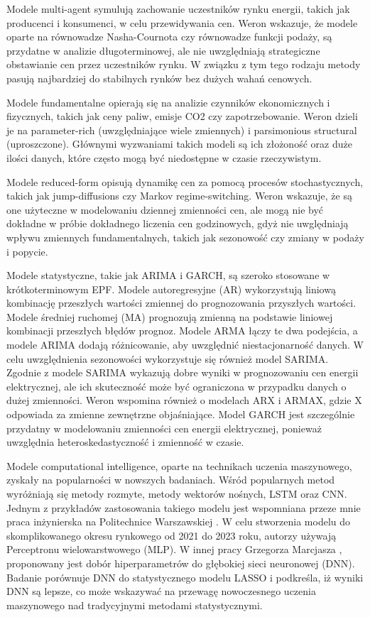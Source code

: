 Modele multi-agent symulują zachowanie uczestników rynku energii, takich jak producenci i konsumenci, w celu przewidywania cen. Weron \cite{WERON20141030} wskazuje, że modele oparte na równowadze Nasha-Cournota czy równowadze funkcji podaży, są przydatne w analizie długoterminowej, ale nie uwzględniają strategiczne obstawianie cen przez uczestników rynku. W związku z tym tego rodzaju metody pasują najbardziej do stabilnych rynków bez dużych wahań cenowych. 

Modele fundamentalne opierają się na analizie czynników ekonomicznych i fizycznych, takich jak ceny paliw, emisje CO2 czy zapotrzebowanie. Weron \cite{WERON20141030} dzieli je na parameter-rich (uwzględniające wiele zmiennych) i parsimonious structural (uproszczone). Głównymi wyzwaniami takich modeli są ich złożoność oraz duże ilości danych, które często mogą być niedostępne w czasie rzeczywistym. 

Modele reduced-form opisują dynamikę cen za pomocą procesów stochastycznych, takich jak jump-diffusions czy Markov regime-switching. Weron \cite{WERON20141030} wskazuje, że są one użyteczne w modelowaniu dziennej zmienności cen, ale mogą nie być dokładne w próbie dokładnego liczenia cen godzinowych, gdyż nie uwględniają wpływu zmiennych fundamentalnych, takich jak sezonowość czy zmiany w podaży i popycie.

Modele statystyczne, takie jak ARIMA i GARCH, są szeroko stosowane w krótkoterminowym EPF. Modele autoregresyjne (AR) wykorzystują liniową kombinację przeszłych wartości zmiennej do prognozowania przyszłych wartości. Modele średniej ruchomej (MA) prognozują zmienną na podstawie liniowej kombinacji przeszłych błędów prognoz. Modele ARMA łączy te dwa podejścia, a modele ARIMA dodają różnicowanie, aby uwzględnić niestacjonarność danych. W celu uwzględnienia sezonowości wykorzystuje się również model SARIMA. Zgodnie z \cite{appliedmath3020018} modele SARIMA wykazują dobre wyniki w prognozowaniu cen energii elektrycznej, ale ich skuteczność może być ograniczona w przypadku danych o dużej zmienności. Weron \cite{WERON20141030} wspomina również o modelach ARX i ARMAX, gdzie X odpowiada za zmienne zewnętrzne objaśniające. Model GARCH jest szczególnie przydatny w modelowaniu zmienności cen energii elektrycznej, ponieważ uwzględnia heteroskedastyczność i zmienność w czasie.

Modele computational intelligence, oparte na technikach uczenia maszynowego, zyskały na popularności w nowszych badaniach. Wśród popularnych metod wyróżniają się metody rozmyte, metody wektorów nośnych, LSTM oraz CNN. Jednym z przykładów zastosowania takiego modelu jest wspomniana przeze mnie praca inżynierska na Politechnice Warszawskiej \cite{MGR2025}. W celu stworzenia modelu do skomplikowanego okresu rynkowego od 2021 do 2023 roku, autorzy używają Perceptronu wielowarstwowego (MLP). W innej pracy Grzegorza Marcjasza \cite{en13184605}, proponowany jest dobór hiperparametrów do głębokiej sieci neuronowej (DNN). Badanie porównuje DNN do statystycznego modelu LASSO i podkreśla, iż wyniki DNN są lepsze, co może wskazywać na przewagę nowoczesnego uczenia maszynowego nad tradycyjnymi metodami statystycznymi.

